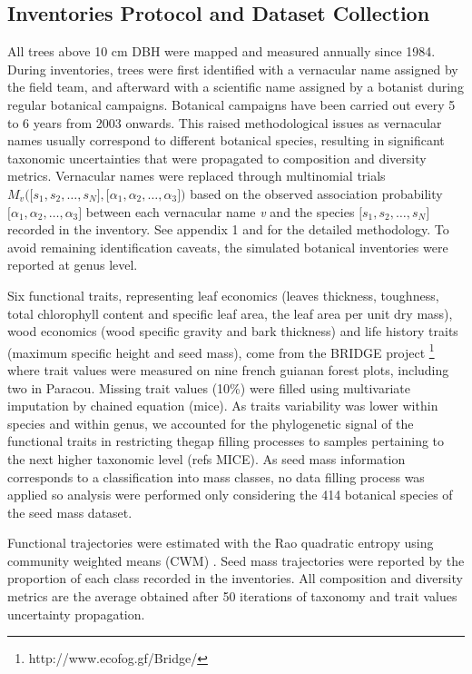 \documentclass[fleqn,10pt]{ArtEcoFoG} %
\begin{document}
\subsection{Inventories Protocol and Dataset
Collection}\label{inventories-protocol-and-dataset-collection}

All trees above 10 cm DBH were mapped and measured annually since 1984.
During inventories, trees were first identified with a vernacular name
assigned by the field team, and afterward with a scientific name
assigned by a botanist during regular botanical campaigns. Botanical
campaigns have been carried out every 5 to 6 years from 2003 onwards.
This raised methodological issues as vernacular names usually correspond
to different botanical species, resulting in significant taxonomic
uncertainties that were propagated to composition and diversity metrics.
Vernacular names were replaced through multinomial trials
\(M_v\Big(\big[s_1, s_2, …, s_N\big],\big[\alpha_1, \alpha_2,…, \alpha_3\big]\Big)\)
based on the observed association probability
\(\big[\alpha_1, \alpha_2,…, \alpha_3\big]\) between each vernacular
name \emph{v} and the species \(\big[s_1, s_2, …, s_N\big]\) recorded in
the inventory. See appendix 1 and \citet{Aubry-Kientz2013} for the
detailed methodology. To avoid remaining identification caveats, the
simulated botanical inventories were reported at genus level.

Six functional traits, representing leaf economics (leaves thickness,
toughness, total chlorophyll content and specific leaf area, the leaf
area per unit dry mass), wood economics (wood specific gravity and bark
thickness) and life history traits (maximum specific height and seed
mass), come from the BRIDGE project \footnote{http://www.ecofog.gf/Bridge/}
where trait values were measured on nine french guianan forest plots,
including two in Paracou. Missing trait values (10\%) were filled using
multivariate imputation by chained equation (mice). As traits
variability was lower within species and within genus, we accounted for
the phylogenetic signal of the functional traits in restricting thegap
filling processes to samples pertaining to the next higher taxonomic
level (refs MICE). As seed mass information corresponds to a
classification into mass classes, no data filling process was applied so
analysis were performed only considering the 414 botanical species of
the seed mass dataset.

Functional trajectories were estimated with the Rao quadratic entropy
using community weighted means (CWM) \citep{Diaz2007, Garnier2004}. Seed
mass trajectories were reported by the proportion of each class recorded
in the inventories. All composition and diversity metrics are the
average obtained after 50 iterations of taxonomy and trait values
uncertainty propagation.
\end{document}
